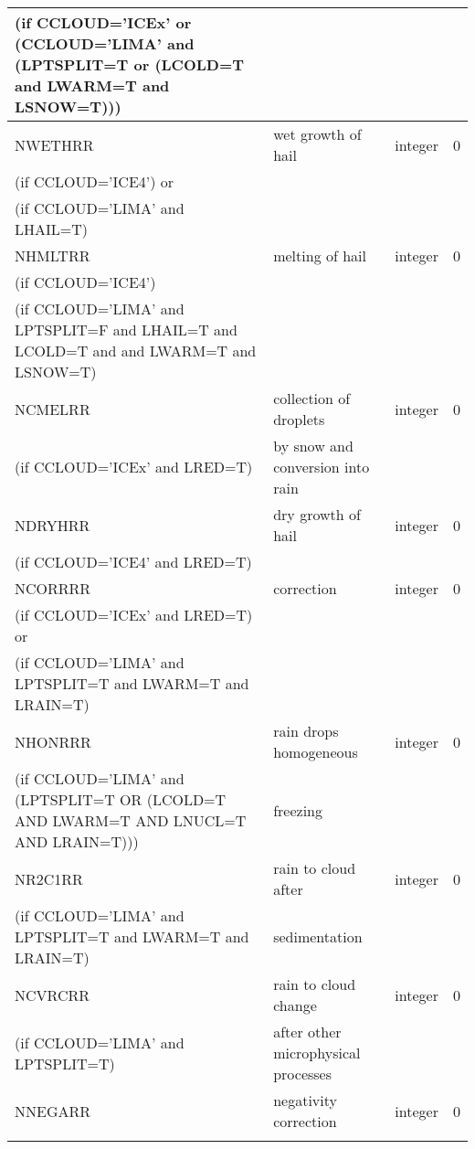 \begin{longtable} {|p{}|p{}|>{\centering}p{}|p{}<{\centering}|}
(if CCLOUD='ICEx' or (CCLOUD='LIMA' and (LPTSPLIT=T or (LCOLD=T and LWARM=T and LSNOW=T))) & & & \\\hline
NWETHRR  & wet growth of hail & integer  &  0 \index{NWETHRR!\innam{NAM\_BU\_RRR}}\\ \nopagebreak
(if CCLOUD='ICE4') or & &   &  \\ \nopagebreak
(if CCLOUD='LIMA' and LHAIL=T) & &   &  \\\hline
NHMLTRR  & melting of hail& integer  &  0 \index{NHMLTRR!\innam{NAM\_BU\_RRR}}\\ \nopagebreak
(if CCLOUD='ICE4')   &   &       &   \\ \nopagebreak
(if CCLOUD='LIMA' and LPTSPLIT=F and LHAIL=T and LCOLD=T and and LWARM=T and LSNOW=T)   &  &        &   \\\hline
NCMELRR  & collection of droplets & integer  &  0 \index{NCMELRR!\innam{NAM\_BU\_RRR}}\\ \nopagebreak
(if CCLOUD='ICEx' and LRED=T) & by snow and conversion into rain &   &  \\\hline
NDRYHRR  & dry growth of hail & integer  &  0 \index{NDRYHRR!\innam{NAM\_BU\_RRR}}\\ \nopagebreak
(if CCLOUD='ICE4' and LRED=T) & &   &  \\\hline
NCORRRR  & correction & integer  &  0 \index{NCORRRR!\innam{NAM\_BU\_RRR}}\\ \nopagebreak
(if CCLOUD='ICEx' and LRED=T) or & &   &  \\ \nopagebreak
(if CCLOUD='LIMA' and LPTSPLIT=T and LWARM=T and LRAIN=T) & &   &  \\\hline
NHONRRR  & rain drops homogeneous  & integer  &  0 \index{NHONRRR!\innam{NAM\_BU\_RRR}}\\ \nopagebreak
(if CCLOUD='LIMA' and (LPTSPLIT=T OR (LCOLD=T AND LWARM=T AND LNUCL=T AND LRAIN=T)))   & freezing  &       &   \\\hline
NR2C1RR & rain to cloud after  & integer  &  0 \index{NR2C1RR!\innam{NAM\_BU\_RRR}}\\ \nopagebreak
(if CCLOUD='LIMA' and LPTSPLIT=T and LWARM=T and LRAIN=T) & sedimentation&   &  \\\hline
NCVRCRR  & rain to cloud change & integer  &  0 \index{NCVRCRR!\innam{NAM\_BU\_RRR}}\\ \nopagebreak
(if CCLOUD='LIMA' and LPTSPLIT=T) &after other microphysical processes &   &  \\\hline
NNEGARR   & negativity correction & integer  &  0 \index{NNEGARR!\innam{NAM\_BU\_RRR}}\\ \nopagebreak

\end{longtable}

